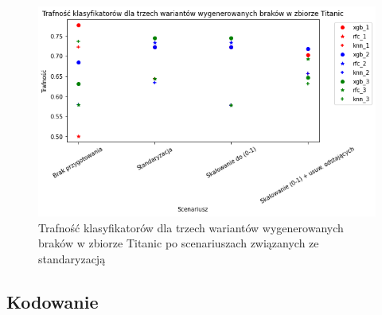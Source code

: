 \documentclass{book}
\begin{document}
\begin{figure}[H]
    \centerline{\includegraphics[scale=0.8]{Titanic_Standaryzacja}}
    \centering
    \caption{Trafność klasyfikatorów dla trzech wariantów wygenerowanych braków w zbiorze Titanic po scenariuszach związanych ze standaryzacją}
    \end{figure}


\subsection{Kodowanie}
\end{document}
